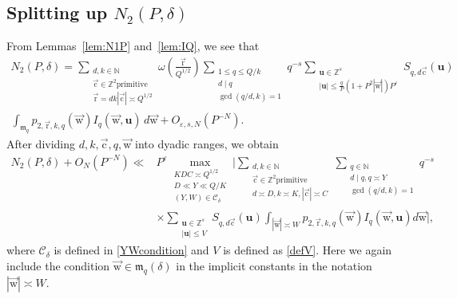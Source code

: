 \documentclass[letterpaper,11pt]{amsart}
\numberwithin{equation}{section}
\theoremstyle{definition}
\numberwithin{equation}{section}
\newcommand{\Z}{\mathbb{Z}}
\newcommand{\ZZ}{\mathbb{Z}}
\newcommand{\NN}{\mathbb{N}}
\newcommand{\uu}{\mathbf{u}}
\newcommand{\ur}{\vec{\mathrm{r}}}
\newcommand{\uw}{{\vec{\mathrm{w}}}}
\newcommand{\uc}{{\vec{\mathrm{c}}}}
\newcommand{\scrm}{\mathfrak{m}}
\newcommand{\ve}{\varepsilon}
\begin{document}
\subsection{Splitting up $N_2(P,\delta)$}\label{sec:N2split}\label{sec:Qdelta-and-Sigma}
From Lemmas~\ref{lem:N1P} and~\ref{lem:IQ}, we see that 
	\begin{multline*}
N_2(P, \delta)
=\sum_{\substack{d,k\in\NN\\ \uc\in\ZZ^2 \mathrm{primitive}\\ \ur=dk|\uc|\asymp Q^{1/2} }}\omega(\frac{\ur}{Q^{1/2}})\sum_{\substack{1\leq q\leq Q/k\\ d\mid q\\ \gcd(q/d,k)=1}} q^{-s}				\sum_{\substack{\uu\in \Z^s\\|\uu|\leq \frac{q}{P}(1+P^2|\uw|)P^\ve}}S_{q,d\uc}(\uu)\\
\int_{\scrm_q}		
			p_{2,\ur,k,q}(\uw) I_q(\uw,\uu)
			\,d\uw+O_{\ve,s,N}(P^{-N}).
	\end{multline*}
After dividing $d, k, \uc, q, \uw$ into dyadic ranges, we obtain 
\begin{equation}\begin{split}\label{N2dyadic}
   N_2(P, \delta)+O_N( P^{-N})\ll{}& P^\varepsilon \max_{\substack{KDC\asymp Q^{1/2}\\ D\ll Y\ll Q/K\\ (Y, W)\in \mathcal C_\delta}}\bigg\lvert\sum_{\substack{d,k\in \NN \\ \uc\in\ZZ^2 \mathrm{primitive}\\ d\asymp D, k\asymp K, |\uc| \asymp C }}\sum_{\substack{q\in \mathbb N\\ d\mid q, q\asymp Y\\\gcd(q/d,k)=1}} q^{-s}	\\ &\times 			\sum_{\substack{\uu\in \Z^s\\|\uu|\leq V}}S_{q,d\uc}(\uu)
   \int_{|\uw| \asymp W}		
			p_{2,\ur,k,q}(\uw) I_q(\uw,\uu)d\uw\bigg\lvert,\end{split}
\end{equation}
where $\mathcal C_\delta$ is defined in \eqref{YWcondition} and $V$ is defined as \eqref{defV}. Here we again include the condition $\uw\in \mathfrak m_q(\delta)$ in the implicit constants in the notation $|\uw|\asymp W$. 
\end{document}
